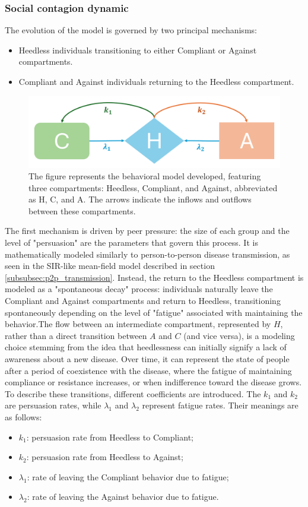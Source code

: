 \subsubsection{Social contagion dynamic}
The evolution of the model is governed by two principal mechanisms: \begin{itemize} 
	\item Heedless individuals transitioning to either Compliant or Against compartments. 
	\item Compliant and Against individuals returning to the Heedless compartment. 
\end{itemize}
\begin{figure}[ht]
	\centering
	\includegraphics[width=0.72\linewidth]{1_corpo/figure/behavior_model_figure}
	\caption[Behavior model]{The figure represents the behavioral model developed, featuring three compartments: Heedless, Compliant, and Against, abbreviated as H, C, and A. The arrows indicate the inflows and outflows between these compartments.}
	\label{fig:behaviormodelfigure}
\end{figure}
The first mechanism is driven by peer pressure: the size of each group and the level of "persuasion" are the parameters that govern this process. It is mathematically modeled similarly to person-to-person disease transmission, as seen in the SIR-like mean-field model described in section \ref{subsubsec:p2p_transmission}. Instead, the return to the Heedless compartment is modeled as a "spontaneous decay" process: individuals naturally leave the Compliant and Against compartments and return to Heedless, transitioning spontaneously depending on the level of "fatigue" associated with maintaining the behavior.The flow between an intermediate compartment, represented by $H$, rather than a direct transition between $A$ and $C$ (and vice versa), is a modeling choice stemming from the idea that heedlessness can initially signify a lack of awareness about a new disease. Over time, it can represent the state of people after a period of coexistence with the disease, where the fatigue of maintaining compliance or resistance increases, or when indifference toward the disease grows.
To describe these transitions, different coefficients are introduced. The $k_1$ and $k_2$ are persuasion rates, while $\lambda_1$ and $\lambda_2$ represent fatigue rates. Their meanings are as follows: \begin{itemize} 
	\item $k_1$: persuasion rate from Heedless to Compliant; 
	\item $k_2$: persuasion rate from Heedless to Against; 
	\item $\lambda_1$: rate of leaving the Compliant behavior due to fatigue; 
	\item $\lambda_2$: rate of leaving the Against behavior due to fatigue. 
\end{itemize}

